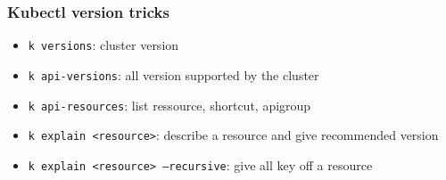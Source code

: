 \subsubsection{Kubectl version tricks}
\begin{frame}[fragile]{\subsubsecname}
  \begin{itemize}
    \item \texttt{k versions}: cluster version
    \item \texttt{k api-versions}: all version supported by the cluster
    \item \texttt{k api-resources}: list ressource, shortcut, apigroup
    \item \texttt{k explain <resource>}: describe a resource and give recommended version
    \item \texttt{k explain <resource> --recursive}: give all key off a resource
  \end{itemize}
\end{frame}
